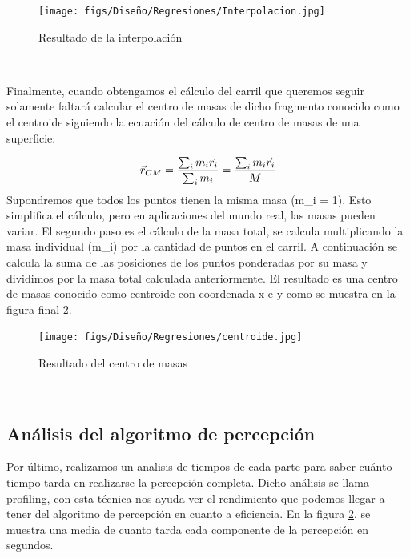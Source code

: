   \begin{figure} [H]
    \begin{center}
      \texttt{[image: figs/Diseño/Regresiones/Interpolacion.jpg]}
    \end{center}
    \caption{Resultado de la interpolación}
    \label{fig:interpolación}
  \end{figure}\

  Finalmente, cuando obtengamos el cálculo del carril que queremos seguir solamente faltará calcular el centro de masas de dicho fragmento conocido como el centroide siguiendo la ecuación
  del cálculo de centro de masas de una superficie: \newline
  

  \begin{equation} 
    \vec{r}_{CM} = \frac{\sum_{i}m_{i} \vec{r}_{i}}{\sum_{i}m_{i}} = \frac{\sum_{i}m_{i} \vec{r}_{i}}{M} 
    \newline
  \end{equation} 
  \newline
  Supondremos que todos los puntos tienen la misma masa (m\_i = 1). Esto simplifica el cálculo, pero en aplicaciones del mundo real, las masas pueden variar.
  El segundo paso es el cálculo de la masa total, se calcula multiplicando la masa individual (m\_i) por la cantidad de puntos en el carril. A continuación se calcula
  la suma de las posiciones de los puntos ponderadas por su masa y dividimos por la masa total calculada anteriormente. El resultado es una centro de masas conocido como centroide
  con coordenada x e y como se muestra en la figura final \ref{fig:centro de masas}. \newline

  \begin{figure} [H]
    \begin{center}
      \texttt{[image: figs/Diseño/Regresiones/centroide.jpg]}
    \end{center}
    \caption{Resultado del centro de masas}
    \label{fig:centro de masas}
  \end{figure}\

  \subsection{Análisis del algoritmo de percepción}
  \label{sec:Análisis del algoritmo de percepción}
  Por último, realizamos un analisis de tiempos de cada parte para saber cuánto tiempo tarda en realizarse la percepción completa. Dicho análisis se llama profiling, con esta técnica 
  nos ayuda ver el rendimiento que podemos llegar a tener del algoritmo de percepción en cuanto a eficiencia. En la figura \ref{fig:centro de masas}, 
  se muestra una media de cuanto tarda cada componente de la percepción en segundos.


